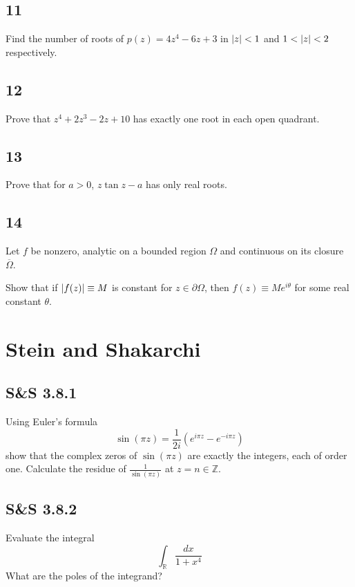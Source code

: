 \documentclass{scrreport}
\DeclarePairedDelimiter\abs{\lvert}{\rvert}%
\begin{document}
\section{11}
Find the number of roots of $p(z) = 4z^4 - 6z + 3$ in $\abs{z} < 1$ and $1 < \abs{z} < 2$ respectively.

\section{12}
Prove that $z^4 + 2z^3 -2z + 10$ has exactly one root in each open quadrant.

\section{13}
Prove that for $a> 0$, $z\tan z - a$ has only real roots.

\section{14}
Let $f$ be nonzero, analytic on a bounded region $\Omega$ and continuous on its closure $\overline \Omega$.

Show that if $\abs{f(z)} \equiv M$ is constant for $z\in \partial \Omega$, then $f(z) \equiv Me^{i\theta}$ for some real constant $\theta$.

\chapter{Stein and Shakarchi}
\section{S&S 3.8.1}

Using Euler's formula
\begin{equation}
    \sin(\pi z) = \frac 1 {2i}( e^{i\pi z} - e^{-i\pi z} )
\end{equation}
show that the complex zeros of $\sin(\pi z)$ are exactly the integers, each of order one.
Calculate the residue of $\frac 1 {\sin(\pi z)}$ at $z=n\in \mathbb{Z}$.

\section{S&S 3.8.2}
Evaluate the integral
\begin{equation}
    \int_{\mathbb{R}} \frac{dx}{1+x^4} 
\end{equation}
What are the poles of the integrand?
\end{document}
